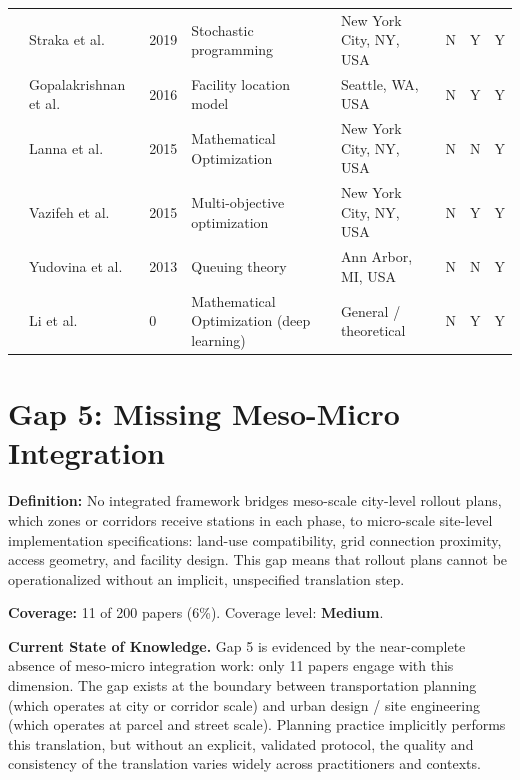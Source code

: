 \documentclass[letterpaper, 12pt, oneside, doublespacing]{Thesis}
\begin{document}
\begin{longtable}{L{0.9cm} L{1.8cm} L{0.7cm} L{2.5cm} L{2.1cm} L{0.7cm} L{0.7cm} L{0.7cm}}
\cite{predicting_popularity_2019} & Straka et al. & 2019 & Stochastic programming & New York City, NY, USA & N & Y & Y \\
\cite{demand_prediction_2016} & Gopalakrishnan et al. & 2016 & Facility location model & Seattle, WA, USA & N & Y & Y \\
\cite{electric_vehicles_2015} & Lanna et al. & 2015 & Mathematical Optimization & New York City, NY, USA & N & N & Y \\
\cite{optimizing_the_2015} & Vazifeh et al. & 2015 & Multi-objective optimization & New York City, NY, USA & N & Y & Y \\
\cite{socially_optimal_2013} & Yudovina et al. & 2013 & Queuing theory & Ann Arbor, MI, USA & N & N & Y \\
\cite{electric_vehicle_0} & Li et al. & 0 & Mathematical Optimization (deep learning) & General {\slash} theoretical & N & Y & Y \\
\bottomrule
\end{longtable}


\section{Gap 5: Missing Meso-Micro Integration}


\noindent \textbf{Definition:} No integrated framework bridges meso-scale city-level rollout plans, which zones or corridors receive stations in each phase, to micro-scale site-level implementation specifications: land-use compatibility, grid connection proximity, access geometry, and facility design. This gap means that rollout plans cannot be operationalized without an implicit, unspecified translation step.



\noindent \textbf{Coverage:} 11 of 200 papers (6\%). Coverage level: \textbf{Medium}.



\noindent \textbf{Current State of Knowledge.} Gap 5 is evidenced by the near-complete absence of meso-micro integration work: only 11 papers engage with this dimension. The gap exists at the boundary between transportation planning (which operates at city or corridor scale) and urban design / site engineering (which operates at parcel and street scale). Planning practice implicitly performs this translation, but without an explicit, validated protocol, the quality and consistency of the translation varies widely across practitioners and contexts.
\end{document}
